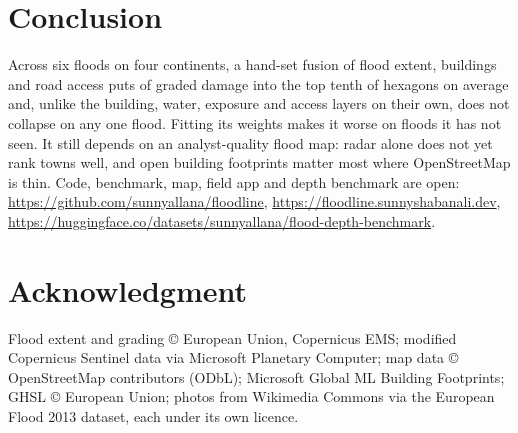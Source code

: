 \documentclass[conference]{IEEEtran}
\begin{document}
\section{Conclusion}
Across six floods on four continents, a hand-set fusion of flood extent, buildings and road access puts \capEHA{} of graded damage into the top tenth of hexagons on average and, unlike the building, water, exposure and access layers on their own, does not collapse on any one flood. Fitting its weights makes it worse on floods it has not seen. It still depends on an analyst-quality flood map: radar alone does not yet rank towns well, and open building footprints matter most where OpenStreetMap is thin. Code, benchmark, map, field app and depth benchmark are open: \url{https://github.com/sunnyallana/floodline}, \url{https://floodline.sunnyshabanali.dev}, \url{https://huggingface.co/datasets/sunnyallana/flood-depth-benchmark}.

\section*{Acknowledgment}
Flood extent and grading \copyright{} European Union, Copernicus EMS; modified Copernicus Sentinel data via Microsoft Planetary Computer; map data \copyright{} OpenStreetMap contributors (ODbL); Microsoft Global ML Building Footprints; GHSL \copyright{} European Union; photos from Wikimedia Commons via the European Flood 2013 dataset, each under its own licence.



\end{document}
